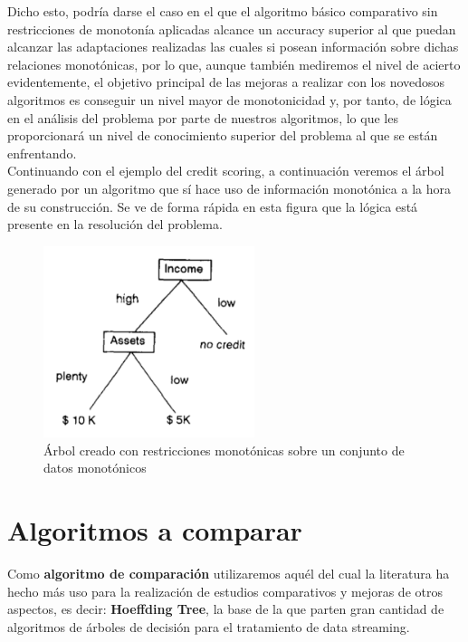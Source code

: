 Dicho esto, podría darse el caso en el que el algoritmo básico comparativo sin restricciones de monotonía aplicadas alcance un accuracy superior al que puedan alcanzar las adaptaciones realizadas las cuales si posean información sobre dichas relaciones monotónicas, por lo que, aunque también mediremos el nivel de acierto evidentemente, el objetivo principal de las mejoras a realizar con los novedosos algoritmos es conseguir un nivel mayor de monotonicidad y, por tanto, de lógica en el análisis del problema por parte de nuestros algoritmos, lo que les proporcionará un nivel de conocimiento superior del problema al que se están enfrentando.\\

Continuando con el ejemplo del credit scoring, a continuación veremos el árbol generado por un algoritmo que sí hace uso de información monotónica a la hora de su construcción. Se ve de forma rápida en esta figura que la lógica está presente en la resolución del problema.

\begin{figure}[H]
	\centering
	\includegraphics[width=0.55\textwidth]{imagenes/arbolBueno} 
	\caption{Árbol creado con restricciones monotónicas sobre un conjunto de datos monotónicos \cite{ref14}}
\end{figure}

\section{Algoritmos a comparar}

Como \textbf{algoritmo de comparación} utilizaremos aquél del cual la literatura ha hecho más uso para la realización de estudios comparativos y mejoras de otros aspectos, es decir: \textbf{Hoeffding Tree}, la base de la que parten gran cantidad de algoritmos de árboles de decisión para el tratamiento de data streaming.\\

